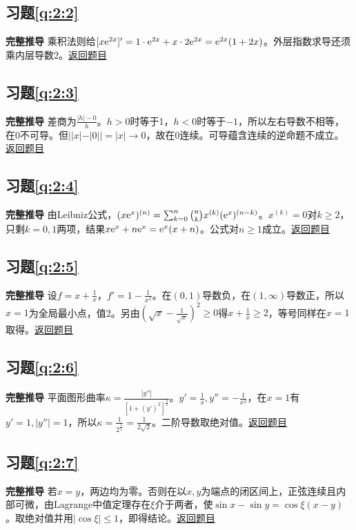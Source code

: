 \subsection*{习题\ref{q:2:2}}\label{a:2:2}\textbf{完整推导} 乘积法则给$[x\mathrm{e}^{2x}]'=1\cdot\mathrm{e}^{2x}+x\cdot2\mathrm{e}^{2x}=\mathrm{e}^{2x}(1+2x)$。外层指数求导还须乘内层导数2。\quad\hyperref[q:2:2]{返回题目}

\subsection*{习题\ref{q:2:3}}\label{a:2:3}\textbf{完整推导} 差商为$\frac{|h|-0}{h}$。$h>0$时等于1，$h<0$时等于$-1$，所以左右导数不相等，在0不可导。但$||x|-|0||=|x|\to0$，故在0连续。可导蕴含连续的逆命题不成立。\quad\hyperref[q:2:3]{返回题目}

\subsection*{习题\ref{q:2:4}}\label{a:2:4}\textbf{完整推导} 由Leibniz公式，$(x\mathrm{e}^x)^{(n)}=\sum_{k=0}^n\binom nkx^{(k)}(\mathrm{e}^x)^{(n-k)}$。$x^{(k)}=0$对$k\ge2$，只剩$k=0,1$两项，结果$x\mathrm{e}^x+n\mathrm{e}^x=\mathrm{e}^x(x+n)$。公式对$n\ge1$成立。\quad\hyperref[q:2:4]{返回题目}

\subsection*{习题\ref{q:2:5}}\label{a:2:5}\textbf{完整推导} 设$f=x+\frac{1}{x}$，$f'=1-\frac{1}{x^2}$。在$(0,1)$导数负，在$(1,\infty)$导数正，所以$x=1$为全局最小点，值2。另由$(\sqrt x-\frac{1}{\sqrt x})^2\ge0$得$x+\frac{1}{x}\ge2$，等号同样在$x=1$取得。\quad\hyperref[q:2:5]{返回题目}

\subsection*{习题\ref{q:2:6}}\label{a:2:6}\textbf{完整推导} 平面图形曲率$\kappa=\frac{|y''|}{[1+(y')^2]^{\frac{3}{2}}}$。$y'=\frac{1}{x},y''=-\frac{1}{x^2}$，在$x=1$有$y'=1,|y''|=1$，所以$\kappa=\frac{1}{2^{\frac{3}{2}}}=\frac{1}{2\sqrt2}$。二阶导数取绝对值。\quad\hyperref[q:2:6]{返回题目}

\subsection*{习题\ref{q:2:7}}\label{a:2:7}\textbf{完整推导} 若$x=y$，两边均为零。否则在以$x,y$为端点的闭区间上，正弦连续且内部可微，由Lagrange中值定理存在$\xi$介于两者，使$\sin x-\sin y=\cos\xi(x-y)$。取绝对值并用$|\cos\xi|\le1$，即得结论。\quad\hyperref[q:2:7]{返回题目}

